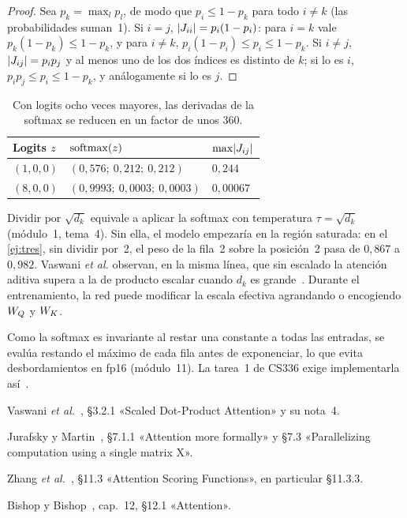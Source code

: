 \begin{proof}
Sea $p_k=\max_lp_l$, de modo que $p_i\le 1-p_k$ para todo $i\ne k$ (las probabilidades suman~1). Si $i=j$, $\lvert J_{ii}\rvert=p_i(1-p_i)$: para $i=k$ vale $p_k(1-p_k)\le 1-p_k$, y para $i\ne k$, $p_i(1-p_i)\le p_i\le 1-p_k$. Si $i\ne j$, $\lvert J_{ij}\rvert=p_ip_j$ y al menos uno de los dos índices es distinto de $k$; si lo es $i$, $p_ip_j\le p_i\le 1-p_k$, y análogamente si lo es $j$.
\end{proof}

\begin{table}[h]
\centering
\begin{tabular}{@{}lll@{}}
\toprule
Logits $z$ & $\operatorname{softmax}(z)$ & $\max\lvert J_{ij}\rvert$ \\
\midrule
$(1,0,0)$ & $(0{,}576;\allowbreak\ 0{,}212;\allowbreak\ 0{,}212)$ & $0{,}244$ \\
$(8,0,0)$ & $(0{,}9993;\allowbreak\ 0{,}0003;\allowbreak\ 0{,}0003)$ & $0{,}00067$ \\
\bottomrule
\end{tabular}
\caption{Con logits ocho veces mayores, las derivadas de la softmax se reducen en un factor de unos 360.}
\label{tab:saturacion}
\end{table}

\begin{observacion}
Dividir por $\sqrt{d_k}$ equivale a aplicar la softmax con temperatura $\tau=\sqrt{d_k}$ (módulo~1, tema~4). Sin ella, el modelo empezaría en la región saturada: en el \cref{ej:tres}, sin dividir por~2, el peso de la fila~2 sobre la posición~2 pasa de $0{,}867$ a $0{,}982$. Vaswani \emph{et al.} observan, en la misma línea, que sin escalado la atención aditiva supera a la de producto escalar cuando $d_k$ es grande~\cite[§3.2.1]{vaswani}. Durante el entrenamiento, la red puede modificar la escala efectiva agrandando o encogiendo $W_{Q}$ y $W_{K}$.
\end{observacion}

\begin{observacion}
Como la softmax es invariante al restar una constante a todas las entradas, se evalúa restando el máximo de cada fila antes de exponenciar, lo que evita desbordamientos en fp16 (módulo~11). La tarea~1 de CS336 exige implementarla así~\cite[§3.4.4]{cs336}.
\end{observacion}

\begin{lecturas}
\item Vaswani \emph{et al.}~\cite{vaswani}, §3.2.1 «Scaled Dot-Product Attention» y su nota~4.
\item Jurafsky y Martin~\cite{jm3}, §7.1.1 «Attention more formally» y §7.3 «Parallelizing computation using a single matrix X».
\item Zhang \emph{et al.}~\cite{d2l}, §11.3 «Attention Scoring Functions», en particular §11.3.3.
\item Bishop y Bishop~\cite{bishopdl}, cap.~12, §12.1 «Attention».
\end{lecturas}

